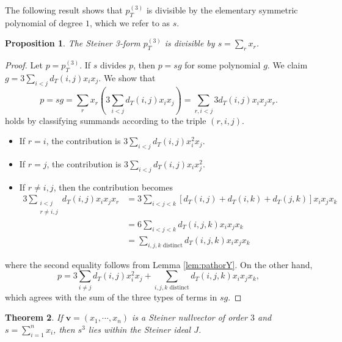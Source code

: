 \documentclass{article}
\newcommand{\bv}{\mathbf{v}}
\newtheorem{theorem}{Theorem}[section]
\newtheorem{prop}[theorem]{Proposition}
\begin{document}
The following result shows that $p^{(3)}_T$ is divisible by the elementary symmetric polynomial of degree $1$, which we refer to as $s$.

\begin{prop}\label{divisible}
    The Steiner 3-form $p^{(3)}_T$ is divisible by $s = \sum_r x_r$. 
\end{prop}

\begin{proof}
    Let $p = p^{(3)}_T$. If $s$ divides $p$, then $p = sg$ for some polynomial $g$. We claim $g = 3\sum_{i<j}d_T(i,j)x_ix_j$. We show that 
    $$
    p = sg = \sum_r x_r \left(3\sum_{i<j}d_T(i,j)x_ix_j\right) = \sum_{r,i<j}  3d_T(i,j)x_ix_j x_r.
    $$
    holds by classifying summands according to the triple $(r,i,j)$. 

    \begin{itemize}
        \item If $r = i$, the contribution is $3\sum_{i<j}d_T(i,j)x_i^2x_j$. 
        \item If $r = j$, the contribution is $3\sum_{i<j}d_T(i,j)x_ix_j^2$.
        \item If $r \neq i,j$, then the contribution becomes 
        \begin{align*}
        3\sum_{\substack{i<j \\ r \neq i,j}} d_T(i,j)x_ix_jx_r &= 3 \sum_{i<j<k} [d_T(i,j) + d_T(i,k) + d_T(j,k)] x_ix_jx_k \\
        &= 6 \sum_{i<j<k} d_T(i,j,k) x_ix_jx_k \\
        &= \sum_{i,j,k \text{ distinct}} d_T(i,j,k) x_ix_jx_k 
        \end{align*}
    \end{itemize}
    where the second equality follows from Lemma \ref{lem:pathorY}. On the other hand,
    $$
    p = 3 \sum_{i \neq j} d_T(i,j) x_i^2 x_j + \sum_{i,j,k \text{ distinct}} d_T(i,j,k) x_i x_j x_k,
    $$
    which agrees with the sum of the three types of terms in $sg$. 
\end{proof}


\begin{theorem}
    If $\bv = (x_1,\cdots, x_n)$ is a Steiner nullvector of order $3$ and $s = \sum_{i=1}^n x_i$, then $s^3$ lies within the Steiner ideal $J$.  
\end{theorem}
\end{document}
